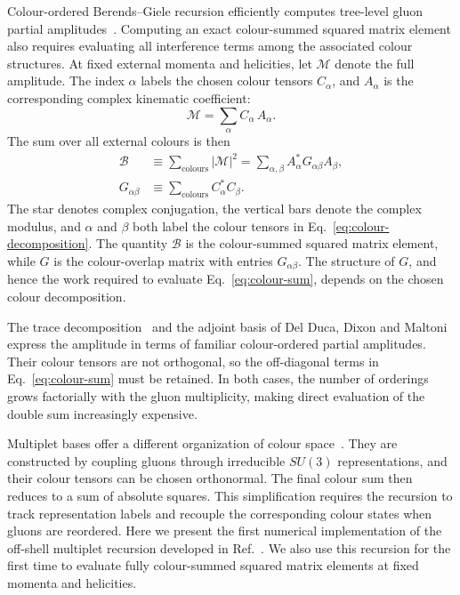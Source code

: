 \documentclass[aps,prd,twocolumn,superscriptaddress,nofootinbib]{revtex4-2}
\begin{document}
Colour-ordered Berends--Giele recursion efficiently computes tree-level gluon
partial amplitudes~\cite{Berends:1987me}.  Computing an exact colour-summed
squared matrix element also requires evaluating all interference terms among
the associated colour structures.
At fixed external momenta and helicities, let $\mathcal M$ denote the full
amplitude.  The index $\alpha$ labels the chosen colour tensors $C_\alpha$,
and $A_\alpha$ is the corresponding complex kinematic
coefficient:
\begin{equation}
  \mathcal M=\sum_{\alpha} C_{\alpha}\,A_{\alpha}.
  \label{eq:colour-decomposition}
\end{equation}
The sum over all external colours is then
\begin{equation}
  \begin{aligned}
    \mathcal B
    &\equiv\sum_{\text{colours}}|\mathcal M|^2
    =\sum_{\alpha,\beta}A_{\alpha}^{*}G_{\alpha\beta}A_{\beta},\\
    G_{\alpha\beta}
    &\equiv\sum_{\text{colours}}C_{\alpha}^{*}C_{\beta}.
  \end{aligned}
  \label{eq:colour-sum}
\end{equation}
The star denotes complex conjugation, the vertical bars denote the complex
modulus, and $\alpha$ and $\beta$ both label the colour tensors in
Eq.~\eqref{eq:colour-decomposition}.  The quantity $\mathcal B$ is the
colour-summed squared matrix element, while $G$ is the colour-overlap matrix
with entries $G_{\alpha\beta}$.  The structure of $G$, and hence the
work required to evaluate Eq.~\eqref{eq:colour-sum}, depends on the chosen
colour decomposition.

The trace decomposition~\cite{Paton:1969je,Mangano:1987xk} and the adjoint
basis of Del Duca, Dixon and Maltoni~\cite{DelDuca:1999rs} express the
amplitude in terms of familiar colour-ordered partial amplitudes.  Their
colour tensors are not orthogonal, so the off-diagonal terms in
Eq.~\eqref{eq:colour-sum} must be retained.  In both cases, the number of
orderings grows factorially with the gluon multiplicity, making direct
evaluation of the double sum increasingly expensive.

Multiplet bases offer a different organization of colour
space~\cite{Keppeler:2012ih,Sjodahl:2018cca}.  They are constructed by coupling
gluons through irreducible $SU(3)$ representations, and their colour tensors
can be chosen orthonormal.  The final colour sum then reduces to a sum of
absolute squares.  This simplification requires the recursion to track
representation labels and recouple the corresponding colour states when
gluons are reordered.  Here we present the first numerical implementation of
the off-shell multiplet recursion
developed in Ref.~\cite{Bolinder:2025gbj}.  We also use this recursion for the
first time to evaluate fully colour-summed squared matrix elements at fixed
momenta and helicities.
\end{document}
